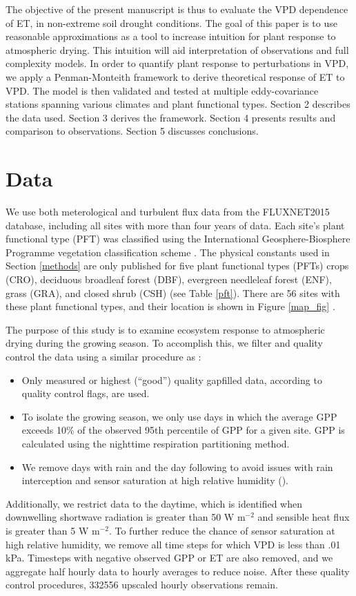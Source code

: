 \documentclass[draft,linenumbers]{agujournal}
\begin{document}
The objective of the present manuscript is thus to evaluate the VPD dependence of ET, in non-extreme soil drought conditions. The goal of this paper is to use reasonable approximations as a tool to increase intuition for plant response to atmospheric drying. This intuition will aid interpretation of observations and full complexity models. In order to quantify plant response to perturbations in VPD, we apply a Penman-Monteith framework to derive theoretical response of ET to VPD. The model is then validated and tested at multiple eddy-covariance stations spanning various climates and plant functional types. Section 2 describes the data used. Section 3 derives the framework. Section 4 presents results and comparison to observations. Section 5 discusses conclusions. 

\section{Data}
\label{data}
We use both meterological and turbulent flux data from the FLUXNET2015 database, including all sites with more than four years of data. Each site's plant functional type (PFT) was classified using the International Geosphere-Biosphere Programme vegetation classification scheme \citep{Loveland_1999}. The physical constants used in Section \ref{methods} are only published for five plant functional types (PFTs) crops (CRO), deciduous broadleaf forest (DBF), evergreen needleleaf forest (ENF), grass (GRA), and closed shrub (CSH) (see Table \ref{pft}). There are 56 sites with these plant functional types, and their location is shown in  Figure \ref{map_fig} .

The purpose of this study is to examine ecosystem response to atmospheric drying during the growing season. To accomplish this, we filter and quality control the data using a similar procedure as \cite{Zhou_2015}:
\begin{itemize}
\item Only measured or highest (``good'') quality gapfilled data, according to quality control flags, are used.
\item To isolate the growing season, we only use days in which the average GPP exceeds 10\% of the observed 95th percentile of GPP for a given site. GPP is calculated using the nighttime respiration partitioning method.
\item We remove days with rain and the day following to avoid issues with rain interception and sensor saturation at high relative humidity (\cite{MEDLYN_2011}).
\end{itemize}
Additionally, we restrict data to the daytime, which is identified when downwelling shortwave radiation is greater than 50 W m$^{-2}$ and sensible heat flux is greater than 5 W m$^{-2}$. To further reduce the chance of sensor saturation at high relative humidity, we remove all time steps for which VPD is less than .01 kPa. Timesteps with negative observed GPP or ET are also removed, and we aggregate half hourly data to hourly averages to reduce noise. After these quality control procedures, 332556 upscaled hourly observations remain. 
\end{document}
